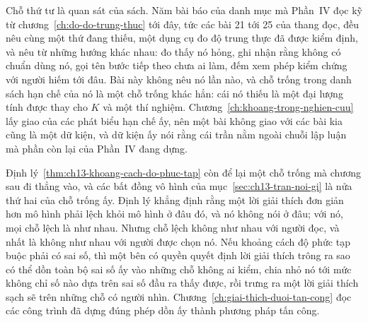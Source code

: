 Chỗ thứ tư là quan sát của sách. Năm bài báo của danh mục mà Phần~IV đọc kỹ từ
chương~\ref{ch:do-do-trung-thuc} tới đây, tức các bài 21 tới 25 của thang đọc,
đều nêu cùng một thứ đang thiếu, một
dụng cụ đo độ trung thực đã được kiểm định, và nêu từ những hướng khác nhau: đo
thấy nó hỏng, ghi nhận rằng không có chuẩn dùng nó, gọi tên bước tiếp theo chưa
ai làm, đếm xem phép kiểm chứng với người hiếm tới đâu. Bài này không nêu nó
lần nào, và chỗ trống trong danh sách hạn chế của nó là một chỗ trống khác hẳn:
cái nó thiếu là một đại lượng tính được thay cho $K$ và một thí nghiệm.
Chương~\ref{ch:khoang-trong-nghien-cuu} lấy giao của các phát biểu hạn chế ấy,
nên một bài không giao với các bài kia cũng là một dữ kiện, và dữ kiện ấy nói
rằng cái trần nằm ngoài chuỗi lập luận mà phần còn lại của Phần~IV đang dựng.

Định lý~\ref{thm:ch13-khoang-cach-do-phuc-tap} còn để lại một chỗ trống mà
chương sau đi thẳng vào, và các bất đồng vô hình của
mục~\ref{sec:ch13-tran-noi-gi} là nửa thứ hai của chỗ trống ấy. Định lý khẳng
định rằng một lời giải thích đơn giản hơn mô hình phải lệch khỏi mô hình ở đâu
đó, và nó không nói ở đâu; với nó, mọi chỗ lệch là như nhau. Nhưng chỗ lệch
không như nhau với người đọc, và nhất là không như nhau với người được chọn nó.
Nếu khoảng cách độ phức tạp buộc phải có sai số, thì một bên có quyền quyết định
lời giải thích trông ra sao có thể dồn toàn bộ sai số ấy vào những chỗ không ai
kiểm, chia nhỏ nó tới mức không chỉ số nào dựa trên sai số đầu ra thấy được, rồi
trưng ra một lời giải thích sạch sẽ trên những chỗ có người nhìn.
Chương~\ref{ch:giai-thich-duoi-tan-cong} đọc các công trình đã dựng đúng phép
dồn ấy thành phương pháp tấn công.
